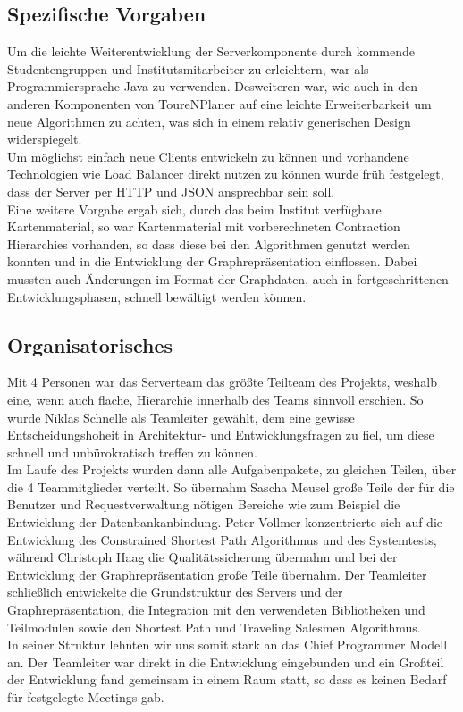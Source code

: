 \subsection*{Spezifische Vorgaben}
Um die leichte Weiterentwicklung der Serverkomponente durch kommende Studentengruppen und Institutsmitarbeiter zu erleichtern, war als Programmiersprache Java zu verwenden. Desweiteren war, wie auch in den anderen Komponenten von ToureNPlaner auf eine leichte Erweiterbarkeit um neue Algorithmen zu achten, was sich in einem relativ generischen Design widerspiegelt.\\
Um möglichst einfach neue Clients entwickeln zu können und vorhandene Technologien wie Load Balancer direkt nutzen zu können wurde früh festgelegt, dass der Server per HTTP und JSON ansprechbar sein soll.\\
Eine weitere Vorgabe ergab sich, durch das beim Institut verfügbare Kartenmaterial, so war Kartenmaterial mit vorberechneten Contraction Hierarchies vorhanden, so dass diese bei den Algorithmen genutzt werden konnten und in die Entwicklung der Graphrepräsentation einflossen. Dabei mussten auch Änderungen im Format der Graphdaten, auch in fortgeschrittenen Entwicklungsphasen, schnell bewältigt werden können.
\subsection*{Organisatorisches}
Mit 4 Personen war das Serverteam das größte Teilteam des Projekts, weshalb eine, wenn auch flache, Hierarchie innerhalb des Teams sinnvoll erschien. So wurde Niklas Schnelle als Teamleiter gewählt, dem eine gewisse Entscheidungshoheit in Architektur- und Entwicklungsfragen zu fiel, um diese schnell und unbürokratisch treffen zu können.\\
Im Laufe des Projekts wurden dann alle Aufgabenpakete, zu gleichen Teilen, über die 4 Teammitglieder verteilt.
So übernahm Sascha Meusel große Teile der für die Benutzer und Requestverwaltung nötigen Bereiche wie zum Beispiel die Entwicklung der Datenbankanbindung.
Peter Vollmer konzentrierte sich auf die Entwicklung des Constrained Shortest Path Algorithmus und des Systemtests, während Christoph Haag die Qualitätssicherung übernahm und bei der Entwicklung der Graphrepräsentation große Teile übernahm. Der Teamleiter schließlich entwickelte die Grundstruktur des Servers und der Graphrepräsentation, die Integration mit den verwendeten Bibliotheken und Teilmodulen sowie den Shortest Path und Traveling Salesmen Algorithmus.\\
In seiner Struktur lehnten wir uns somit stark an das Chief Programmer Modell an. Der Teamleiter war direkt in die Entwicklung eingebunden und ein Großteil der Entwicklung fand gemeinsam in einem Raum statt, so dass es keinen Bedarf für festgelegte Meetings gab.
